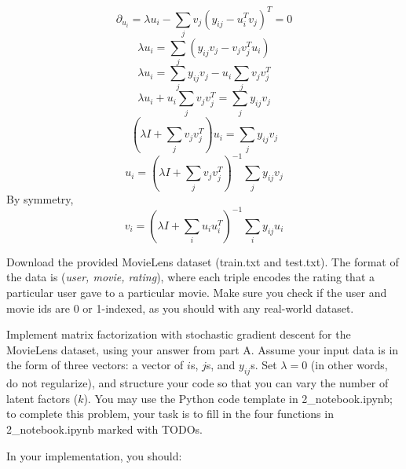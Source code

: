 \begin{solution}
	\begin{equation}
		\partial_{u_i} = \lambda u_i - \sum_j v_j (y_{ij} - u_i^Tv_j)^T = 0
	\end{equation}
	\begin{equation}
		\lambda u_i = \sum_j (y_{ij}v_j  - v_j v_j^T u_i)
	\end{equation}
	\begin{equation}
		\lambda u_i = \sum_j y_{ij}v_j  - u_i \sum_j v_j v_j^T
	\end{equation}
	\begin{equation}
		\lambda u_i +  u_i \sum_j v_j v_j^T = \sum_j y_{ij}v_j
	\end{equation}
	\begin{equation}
		(\lambda I +  \sum_j v_j v_j^T)u_i = \sum_j y_{ij}v_j
	\end{equation}
	\begin{equation}
		u_i = (\lambda I +  \sum_j v_j v_j^T)^{-1} \sum_j y_{ij}v_j
	\end{equation}
	By symmetry,
	\begin{equation}
		v_i = (\lambda I +  \sum_i u_i u_i^T)^{-1} \sum_i y_{ij}u_i
	\end{equation}

\end{solution}

\problem[10]
Download the provided MovieLens dataset (train.txt and test.txt).  The format of the data is (\emph{user, movie, rating}), where each triple encodes the rating that a particular user gave to a particular movie. Make sure you check if the user and movie ids are 0 or 1-indexed, as you should with any real-world dataset.

Implement matrix factorization with stochastic gradient descent for the MovieLens dataset, using your answer from part A. Assume your input data is in the form of three vectors: a vector of $i$s, $j$s, and $y_{ij}$s. Set $\lambda = 0$ (in other words, do not regularize), and structure your code so that you can vary the number of latent factors ($k$). You may use the Python code template in 2_notebook.ipynb; to complete this problem, your task is to fill in the four functions in 2_notebook.ipynb marked with TODOs.

In your implementation, you should:

